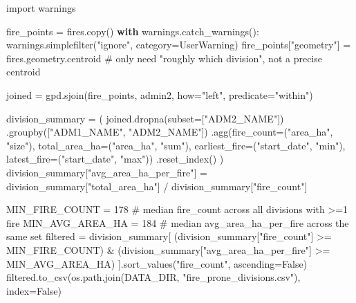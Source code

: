 \documentclass[
  letterpaper,
  DIV=11,
  numbers=noendperiod]{scrartcl}
\newenvironment{Shaded}{\begin{snugshade}}{\end{snugshade}}
\newcommand{\CommentTok}[1]{\textcolor[rgb]{0.37,0.37,0.37}{#1}}
\newcommand{\ControlFlowTok}[1]{\textcolor[rgb]{0.00,0.23,0.31}{\textbf{#1}}}
\newcommand{\DecValTok}[1]{\textcolor[rgb]{0.68,0.00,0.00}{#1}}
\newcommand{\ImportTok}[1]{\textcolor[rgb]{0.00,0.46,0.62}{#1}}
\newcommand{\NormalTok}[1]{\textcolor[rgb]{0.00,0.23,0.31}{#1}}
\newcommand{\OperatorTok}[1]{\textcolor[rgb]{0.37,0.37,0.37}{#1}}
\newcommand{\PreprocessorTok}[1]{\textcolor[rgb]{0.68,0.00,0.00}{#1}}
\newcommand{\StringTok}[1]{\textcolor[rgb]{0.13,0.47,0.30}{#1}}
\newcommand{\VariableTok}[1]{\textcolor[rgb]{0.07,0.07,0.07}{#1}}
\begin{document}
\begin{Shaded}
\begin{Highlighting}[]
\ImportTok{import}\NormalTok{ warnings}

\NormalTok{fire\_points }\OperatorTok{=}\NormalTok{ fires.copy()}
\ControlFlowTok{with}\NormalTok{ warnings.catch\_warnings():}
\NormalTok{    warnings.simplefilter(}\StringTok{"ignore"}\NormalTok{, category}\OperatorTok{=}\PreprocessorTok{UserWarning}\NormalTok{)}
\NormalTok{    fire\_points[}\StringTok{"geometry"}\NormalTok{] }\OperatorTok{=}\NormalTok{ fires.geometry.centroid  }\CommentTok{\# only need "roughly which division", not a precise centroid}

\NormalTok{joined }\OperatorTok{=}\NormalTok{ gpd.sjoin(fire\_points, admin2, how}\OperatorTok{=}\StringTok{"left"}\NormalTok{, predicate}\OperatorTok{=}\StringTok{"within"}\NormalTok{)}

\NormalTok{division\_summary }\OperatorTok{=}\NormalTok{ (}
\NormalTok{    joined.dropna(subset}\OperatorTok{=}\NormalTok{[}\StringTok{"ADM2\_NAME"}\NormalTok{])}
\NormalTok{    .groupby([}\StringTok{"ADM1\_NAME"}\NormalTok{, }\StringTok{"ADM2\_NAME"}\NormalTok{])}
\NormalTok{    .agg(fire\_count}\OperatorTok{=}\NormalTok{(}\StringTok{"area\_ha"}\NormalTok{, }\StringTok{"size"}\NormalTok{), total\_area\_ha}\OperatorTok{=}\NormalTok{(}\StringTok{"area\_ha"}\NormalTok{, }\StringTok{"sum"}\NormalTok{),}
\NormalTok{         earliest\_fire}\OperatorTok{=}\NormalTok{(}\StringTok{"start\_date"}\NormalTok{, }\StringTok{"min"}\NormalTok{), latest\_fire}\OperatorTok{=}\NormalTok{(}\StringTok{"start\_date"}\NormalTok{, }\StringTok{"max"}\NormalTok{))}
\NormalTok{    .reset\_index()}
\NormalTok{)}
\NormalTok{division\_summary[}\StringTok{"avg\_area\_ha\_per\_fire"}\NormalTok{] }\OperatorTok{=}\NormalTok{ division\_summary[}\StringTok{"total\_area\_ha"}\NormalTok{] }\OperatorTok{/}\NormalTok{ division\_summary[}\StringTok{"fire\_count"}\NormalTok{]}

\NormalTok{MIN\_FIRE\_COUNT }\OperatorTok{=} \DecValTok{178}     \CommentTok{\# median fire\_count across all divisions with \textgreater{}=1 fire}
\NormalTok{MIN\_AVG\_AREA\_HA }\OperatorTok{=} \DecValTok{184}    \CommentTok{\# median avg\_area\_ha\_per\_fire across the same set}
\NormalTok{filtered }\OperatorTok{=}\NormalTok{ division\_summary[}
\NormalTok{    (division\_summary[}\StringTok{"fire\_count"}\NormalTok{] }\OperatorTok{\textgreater{}=}\NormalTok{ MIN\_FIRE\_COUNT) }\OperatorTok{\&}
\NormalTok{    (division\_summary[}\StringTok{"avg\_area\_ha\_per\_fire"}\NormalTok{] }\OperatorTok{\textgreater{}=}\NormalTok{ MIN\_AVG\_AREA\_HA)}
\NormalTok{].sort\_values(}\StringTok{"fire\_count"}\NormalTok{, ascending}\OperatorTok{=}\VariableTok{False}\NormalTok{)}
\NormalTok{filtered.to\_csv(os.path.join(DATA\_DIR, }\StringTok{"fire\_prone\_divisions.csv"}\NormalTok{), index}\OperatorTok{=}\VariableTok{False}\NormalTok{)}
\end{Highlighting}
\end{Shaded}
\end{document}
